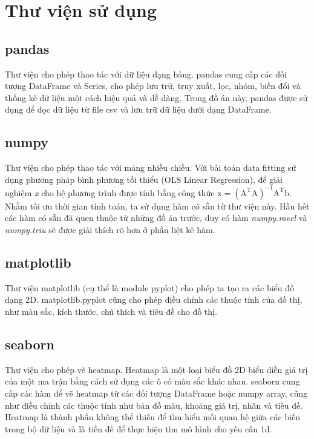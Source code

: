 \documentclass[]{article}
\begin{document}
\setlength{\parskip}{.7em}
\tableofcontents
\newpage

\setlength{\parskip}{.5em}
\newpage


\section{Thư viện sử dụng}
\subsection{pandas}
Thư viện cho phép thao tác với dữ liệu dạng bảng. pandas cung cấp các đối tượng DataFrame và Series, cho phép lưu trữ, truy xuất, lọc, nhóm, biến đổi và thống kê dữ liệu một cách hiệu quả và dễ dàng. Trong đồ án này, pandas được sử dụng để đọc dữ liệu từ file csv và lưu trữ dữ liệu dưới dạng DataFrame.

\subsection{numpy}
Thư viện cho phép thao tác với mảng nhiều chiều. Với bài toán data fitting sử dụng phương pháp bình phương tối thiểu (OLS Linear Regression), để giải nghiệm \textit{x} cho hệ phương trình được tính bằng công thức $\text{x} = (\text{A}^\text{T} \text{A})^{-1} \text{A}^\text{T} \text{b}$. Nhằm tối ưu thời gian tính toán, ta sử dụng hàm có sẵn từ thư viện này. Hầu hết các hàm có sẵn đã quen thuộc từ những đồ án trước, duy có hàm \textit{numpy.ravel} và \textit{numpy.triu} sẽ được giải thích rõ hơn ở phần liệt kê hàm.

\subsection{matplotlib}
Thư viện matplotlib (cụ thể là module pyplot) cho phép ta tạo ra các biểu đồ dạng 2D. matplotlib.pyplot cũng cho phép điều chỉnh các thuộc tính của đồ thị, như màu sắc, kích thước, chú thích và tiêu đề cho đồ thị. 

\subsection{seaborn}
Thư viện cho phép vẽ heatmap. Heatmap là một loại biểu đồ 2D biểu diễn giá trị của một ma trận bằng cách sử dụng các ô có màu sắc khác nhau. seaborn cung cấp các hàm để vẽ heatmap từ các đối tượng DataFrame hoặc numpy array, cũng như điều chỉnh các thuộc tính như bản đồ màu, khoảng giá trị, nhãn và tiêu đề. Heatmap là thành phần không thể thiếu để tìm hiểu mối quan hệ giữa các biến trong bộ dữ liệu và là tiền đề để thực hiện tìm mô hình cho yêu cầu 1d.
\end{document}
